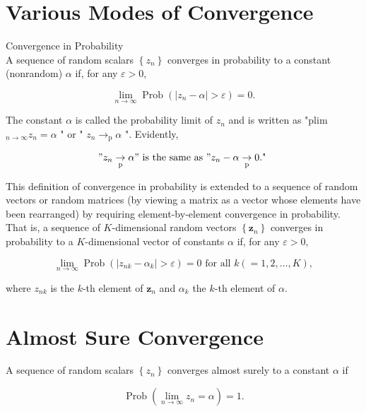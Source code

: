 \documentclass[10pt]{article}
\begin{document}
\section*{Various Modes of Convergence}
Convergence in Probability\\
A sequence of random scalars $\left\{z_{n}\right\}$ converges in probability to a constant (nonrandom) $\alpha$ if, for any $\varepsilon>0$,


\begin{equation*}
\lim _{n \rightarrow \infty} \operatorname{Prob}\left(\left|z_{n}-\alpha\right|>\varepsilon\right)=0 . \tag{2.1.1}
\end{equation*}


The constant $\alpha$ is called the probability limit of $z_{n}$ and is written as "plim ${ }_{n \rightarrow \infty} z_{n}= \alpha$ " or " $z_{n} \rightarrow_{\mathrm{p}} \alpha$ ". Evidently,

$$
" z_{n} \underset{\mathrm{p}}{\rightarrow} \alpha " \text { is the same as } " z_{n}-\alpha \underset{\mathrm{p}}{\rightarrow} 0 \text {." }
$$

This definition of convergence in probability is extended to a sequence of random vectors or random matrices (by viewing a matrix as a vector whose elements have been rearranged) by requiring element-by-element convergence in probability. That is, a sequence of $K$-dimensional random vectors $\left\{\mathbf{z}_{n}\right\}$ converges in probability to a $K$-dimensional vector of constants $\alpha$ if, for any $\varepsilon>0$,


\begin{equation*}
\lim _{n \rightarrow \infty} \operatorname{Prob}\left(\left|z_{n k}-\alpha_{k}\right|>\varepsilon\right)=0 \text { for all } k(=1,2, \ldots, K), \tag{2.1.2}
\end{equation*}


where $z_{n k}$ is the $k$-th element of $\mathbf{z}_{n}$ and $\alpha_{k}$ the $k$-th element of $\alpha$.

\section*{Almost Sure Convergence}
A sequence of random scalars $\left\{z_{n}\right\}$ converges almost surely to a constant $\alpha$ if


\begin{equation*}
\operatorname{Prob}\left(\lim _{n \rightarrow \infty} z_{n}=\alpha\right)=1 . \tag{2.1.3}
\end{equation*}
\end{document}
